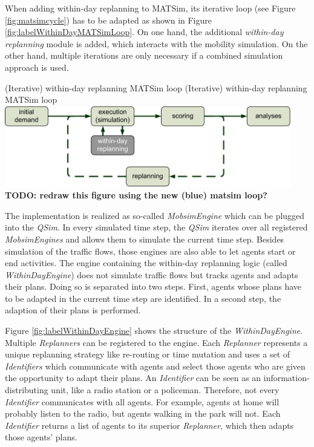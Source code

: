 
When adding within-day replanning to MATSim, its iterative loop (see Figure \ref{fig:matsimcycle}) has to be adapted as shown in Figure \ref{fig:labelWithinDayMATSimLoop}. On one hand, the additional \emph{within-day replanning} module is added, which interacts with the mobility simulation. On the other hand, multiple iterations are only necessary if a combined simulation approach is used.

\createfigure%
{(Iterative) within-day replanning MATSim loop}%
{(Iterative) within-day replanning MATSim loop }%
{\label{fig:labelWithinDayMATSimLoop}}%
{\includegraphics[width=12.5cm, angle=0]{extending/figures/WithinDayReplanning/WithinDayMATSimLoop}}%
{}%
\textbf{TODO: redraw this figure using the new (blue) matsim loop?}


The implementation is realized as so-called \emph{MobsimEngine} which can be plugged into the \emph{QSim}. In every simulated time step, the \emph{QSim} iterates over all registered \emph{MobsimEngines} and allows them to simulate the current time step. Besides simulation of the traffic flows, those engines are also able to let agents start or end activities. The engine containing the within-day replanning logic (called \emph{WithinDayEngine}) does not simulate traffic flows but tracks agents and adapts their plans. Doing so is separated into two steps. First, agents whose plans have to be adapted in the current time step are identified. In a second step, the adaption of their plans is performed. 


Figure \ref{fig:labelWithinDayEngine} shows the structure of the \emph{WithinDayEngine}. Multiple \emph{Replanners} can be registered to the engine. Each \emph{Replanner} represents a unique replanning strategy like re-routing or time mutation and uses a set of \emph{Identifiers} which communicate with agents and select those agents who are given the opportunity to adapt their plans. An \emph{Identifier} can be seen as an information-distributing unit, like a radio station or a policeman. Therefore, not every \emph{Identifier} communicates with all agents. For example, agents at home will probably listen to the radio, but agents walking in the park will not. Each \emph{Identifier} returns a list of agents to its superior \emph{Replanner}, which then adapts those agents' plans.

